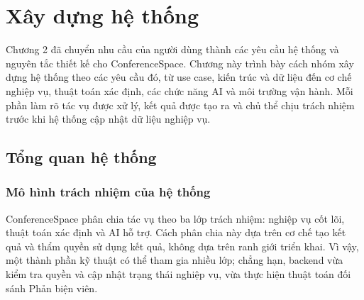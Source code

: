 ﻿%
\chapter{Xây dựng hệ thống}
\label{Chapter3}

Chương 2 đã chuyển nhu cầu của người dùng thành các yêu cầu hệ thống và nguyên tắc thiết kế cho ConferenceSpace. Chương này trình bày cách nhóm xây dựng hệ thống theo các yêu cầu đó, từ use case, kiến trúc và dữ liệu đến cơ chế nghiệp vụ, thuật toán xác định, các chức năng AI và môi trường vận hành. Mỗi phần làm rõ tác vụ được xử lý, kết quả được tạo ra và chủ thể chịu trách nhiệm trước khi hệ thống cập nhật dữ liệu nghiệp vụ.

\section{Tổng quan hệ thống}
\label{sec:ch3-overview-cut}

\subsection{Mô hình trách nhiệm của hệ thống}
\label{subsec:ch3-responsibility-cut}

ConferenceSpace phân chia tác vụ theo ba lớp trách nhiệm: nghiệp vụ cốt lõi, thuật toán xác định và AI hỗ trợ. Cách phân chia này dựa trên cơ chế tạo kết quả và thẩm quyền sử dụng kết quả, không dựa trên ranh giới triển khai. Vì vậy, một thành phần kỹ thuật có thể tham gia nhiều lớp; chẳng hạn, backend vừa kiểm tra quyền và cập nhật trạng thái nghiệp vụ, vừa thực hiện thuật toán đối sánh Phản biện viên.

